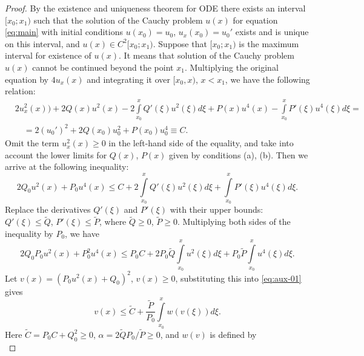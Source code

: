 \begin{proof}
	By the existence and uniqueness theorem for ODE there exists an interval $[x_0; x_1)$ such that the solution of the Cauchy problem $u(x)$ for equation \eqref{eq:main} with initial conditions $u(x_0) = u_0$, $u_{x}(x_0) = u_0'$ exists and is unique on this interval, and $u(x) \in C^2[x_0; x_1)$.
	Suppose that $[x_0; x_1)$ is the maximum interval for existence of $u(x)$.
	It means that solution of the Cauchy problem $u(x)$ cannot be continued beyond the point $x_1$.
	Multiplying the original equation by $4u_{x}(x)$ and integrating it over $[x_0, x)$, $x < x_1$, we have the following relation:
	\begin{equation}
	\begin{aligned}
		& 2 u_x^2(x)) + 2 Q(x) u^2(x) - 2 \int \limits_{x_0}^{x} Q'(\xi) u^2(\xi) d\xi + P(x) u^4(x) - \int \limits_{x_0}^x P'(\xi) u^4(\xi) d\xi = \\
		& \quad = 2 (u_0')^2 + 2 Q(x_0) u_0^2 + P(x_0) u_0^4 \equiv C.
		\label{eq:aux-04}
	\end{aligned}	
	\end{equation}
	Omit the term $u_{x}^2(x) \ge 0$ in the left-hand side of the equality, and take into account the lower limits for $Q(x)$, $P(x)$ given by conditions (a), (b).
	Then we arrive at the following inequality:
	\begin{equation}
		2 Q_0 u^2(x) + P_0 u^4(x) \le C + 2 \int \limits_{x_0}^{x} Q'(\xi) u^2(\xi) d\xi + \int \limits_{x_0}^{x} P'(\xi) u^4(\xi) d\xi.
	\end{equation}
	Replace the derivatives $Q'(\xi)$ and $P'(\xi)$ with their upper bounds: $Q'(\xi) \le \widetilde{Q}$, $P'(\xi) \le \widetilde{P}$, where $\widetilde{Q} \ge 0$, $\widetilde{P} \ge 0$.
	Multiplying both sides of the inequality by $P_0$, we have
	\begin{equation}
		2 Q_0 P_0 u^2(x) + P_0^2 u^4(x) \le P_0 C + 2 P_0 \widetilde{Q} \int \limits_{x_0}^{x} u^2(\xi) d\xi + P_0 \widetilde{P} \int \limits_{x_0}^{x} u^4(\xi) d\xi.
		\label{eq:aux-01}
	\end{equation}
	Let $v(x) = (P_0 u^2(x) + Q_0)^2$, $v(x) \ge 0$, substituting this into \eqref{eq:aux-01} gives
	\begin{equation}
		v(x) \le \widetilde{C} + \dfrac{\widetilde{P}}{P_0} \int \limits_{x_0}^{x} w(v(\xi)) d\xi.
		\label{eq:aux-02}
	\end{equation}
	Here $\widetilde{C} = P_0 C + Q_0^2 \ge 0$, $\alpha = 2 \widetilde{Q} P_0 / \widetilde{P} \ge 0$, and $w(v)$ is defined by
	\begin{equation}

\end{equation}
\end{proof}
